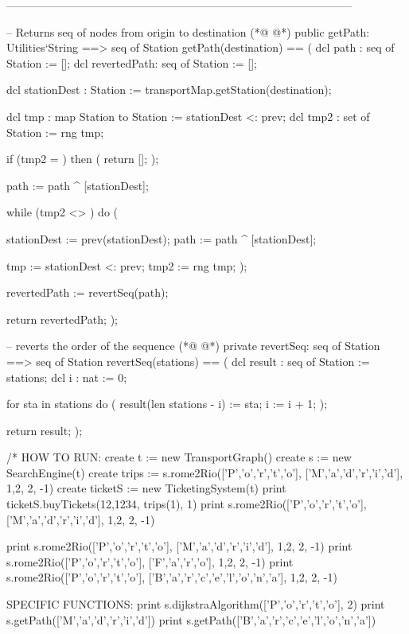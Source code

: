 \begin{vdmpp}[breaklines=true]
 ---------------------------------------------------------------------------------------------
  
 -- Returns seq of nodes from origin to destination
(*@
\label{getPath:262}
@*)
 public getPath: Utilities`String ==> seq of Station
 getPath(destination) ==
 ( 
  dcl path : seq of Station := [];
  dcl revertedPath: seq of Station := [];
  
  dcl stationDest : Station := transportMap.getStation(destination);
  
  dcl tmp : map Station to Station := {stationDest} <: prev;
  dcl tmp2 : set of Station := rng tmp;
  
  if (tmp2 = {}) then (
   return [];
  );
  
  path := path ^ [stationDest];
  
  while (tmp2 <> {}) do (
   
   stationDest := prev(stationDest);
   path := path ^ [stationDest];
   
   tmp := {stationDest} <: prev;
   tmp2 := rng tmp;
  );
  
  revertedPath := revertSeq(path);
  
  return revertedPath;
 );
 
 -- reverts the order of the sequence
(*@
\label{revertSeq:294}
@*)
 private revertSeq: seq of Station ==> seq of Station
 revertSeq(stations) ==
 (
  dcl result : seq of Station := stations;
  dcl i : nat := 0;
  
  for sta in stations do (
    result(len stations - i) := sta;
    i := i + 1;  
  );
  
  return result;
 );
 
 /*
  HOW TO RUN:
  create t := new TransportGraph()
  create s := new SearchEngine(t)
  create trips := s.rome2Rio(['P','o','r','t','o'], ['M','a','d','r','i','d'], {1,2}, 2, -1)
  create ticketS := new TicketingSystem(t)
  print ticketS.buyTickets(12,1234, trips(1), 1)
  print s.rome2Rio(['P','o','r','t','o'], ['M','a','d','r','i','d'], {1,2}, 2, -1)
  
  print s.rome2Rio(['P','o','r','t','o'], ['M','a','d','r','i','d'], {1,2}, 2, -1)
  print s.rome2Rio(['P','o','r','t','o'], ['F','a','r','o'], {1,2}, 2, -1)
  print s.rome2Rio(['P','o','r','t','o'], ['B','a','r','c','e','l','o','n','a'], {1,2}, 2, -1)
  
  SPECIFIC FUNCTIONS: 
  print s.dijkstraAlgorithm(['P','o','r','t','o'], 2)
  print s.getPath(['M','a','d','r','i','d'])
  print s.getPath(['B','a','r','c','e','l','o','n','a'])
  

\end{vdmpp}
